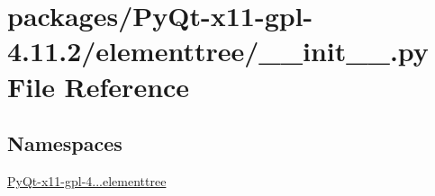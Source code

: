 \hypertarget{packages_2PyQt-x11-gpl-4_811_82_2elementtree_2____init_____8py}{}\section{packages/\+Py\+Qt-\/x11-\/gpl-\/4.11.2/elementtree/\+\_\+\+\_\+init\+\_\+\+\_\+.py File Reference}
\label{packages_2PyQt-x11-gpl-4_811_82_2elementtree_2____init_____8py}
\subsection*{Namespaces}
\begin{DoxyCompactItemize}
\item 
 \hyperlink{namespacePyQt-x11-gpl-4_811_82_1_1elementtree}{Py\+Qt-\/x11-\/gpl-\/4...\+elementtree}
\end{DoxyCompactItemize}
